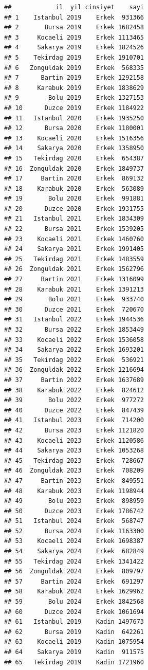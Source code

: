 \documentclass[
]{article}
\begin{document}
\begin{verbatim}
##            il  yil cinsiyet    sayi
## 1    Istanbul 2019    Erkek  931366
## 2       Bursa 2019    Erkek 1682458
## 3     Kocaeli 2019    Erkek 1113465
## 4     Sakarya 2019    Erkek 1824526
## 5    Tekirdag 2019    Erkek 1910701
## 6   Zonguldak 2019    Erkek  568335
## 7      Bartin 2019    Erkek 1292158
## 8     Karabuk 2019    Erkek 1838629
## 9        Bolu 2019    Erkek 1327153
## 10      Duzce 2019    Erkek 1184922
## 11   Istanbul 2020    Erkek 1935250
## 12      Bursa 2020    Erkek 1180001
## 13    Kocaeli 2020    Erkek 1516356
## 14    Sakarya 2020    Erkek 1358950
## 15   Tekirdag 2020    Erkek  654387
## 16  Zonguldak 2020    Erkek 1849737
## 17     Bartin 2020    Erkek  869132
## 18    Karabuk 2020    Erkek  563089
## 19       Bolu 2020    Erkek  991881
## 20      Duzce 2020    Erkek 1931755
## 21   Istanbul 2021    Erkek 1834309
## 22      Bursa 2021    Erkek 1539205
## 23    Kocaeli 2021    Erkek 1460760
## 24    Sakarya 2021    Erkek 1991405
## 25   Tekirdag 2021    Erkek 1483559
## 26  Zonguldak 2021    Erkek 1562796
## 27     Bartin 2021    Erkek 1316099
## 28    Karabuk 2021    Erkek 1391213
## 29       Bolu 2021    Erkek  933740
## 30      Duzce 2021    Erkek  720670
## 31   Istanbul 2022    Erkek 1944536
## 32      Bursa 2022    Erkek 1853449
## 33    Kocaeli 2022    Erkek 1536058
## 34    Sakarya 2022    Erkek 1693201
## 35   Tekirdag 2022    Erkek  536921
## 36  Zonguldak 2022    Erkek 1216694
## 37     Bartin 2022    Erkek 1637689
## 38    Karabuk 2022    Erkek  824612
## 39       Bolu 2022    Erkek  977272
## 40      Duzce 2022    Erkek  847439
## 41   Istanbul 2023    Erkek  714200
## 42      Bursa 2023    Erkek 1121820
## 43    Kocaeli 2023    Erkek 1120586
## 44    Sakarya 2023    Erkek 1053268
## 45   Tekirdag 2023    Erkek  728667
## 46  Zonguldak 2023    Erkek  708209
## 47     Bartin 2023    Erkek  849551
## 48    Karabuk 2023    Erkek 1198944
## 49       Bolu 2023    Erkek  898959
## 50      Duzce 2023    Erkek 1786742
## 51   Istanbul 2024    Erkek  568747
## 52      Bursa 2024    Erkek 1163300
## 53    Kocaeli 2024    Erkek 1698387
## 54    Sakarya 2024    Erkek  682849
## 55   Tekirdag 2024    Erkek 1341422
## 56  Zonguldak 2024    Erkek  809797
## 57     Bartin 2024    Erkek  691297
## 58    Karabuk 2024    Erkek 1629962
## 59       Bolu 2024    Erkek 1842568
## 60      Duzce 2024    Erkek 1061694
## 61   Istanbul 2019    Kadin 1497673
## 62      Bursa 2019    Kadin  642261
## 63    Kocaeli 2019    Kadin 1075954
## 64    Sakarya 2019    Kadin  911575
## 65   Tekirdag 2019    Kadin 1721960

\end{verbatim}
\end{document}
